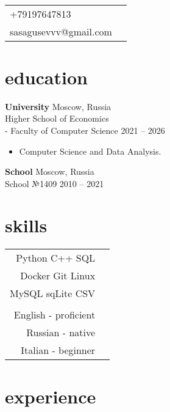 \documentclass[12pt]{article}
\newcommand{\heading}[2]{\centering{\sffamily\Huge #1}\\\smallskip{\large{#2}}}
\newcommand{\entry}[4]{{{\textbf{#1}}} \hfill #3 \\ #2 \hfill #4}
\begin{document}
\vspace*{\fill}

\begin{paracol}{2}

\heading{Alex Gusev}

\switchcolumn

\vspace{0.01\textheight}
\begin{supertabular}{ll}
   +79197647813 \\
  sasagusevvv@gmail.com \\
\end{supertabular}

\bigskip
\switchcolumn*

\section{education}

\entry{University}{Higher School of Economics \\ - Faculty of Computer Science}{Moscow, Russia}{2021 -- 2026}
\begin{itemize}[noitemsep,leftmargin=3.5mm,rightmargin=0mm,topsep=6pt]
  \item Computer Science and Data Analysis.
\end{itemize}

\medskip

\entry{School}{School №1409}{Moscow, Russia}{2010 -- 2021}

\switchcolumn

\section{skills}
\begin{supertabular}{rl}
  Python C++ SQL \\
  Docker Git Linux \\
  MySQL sqLite  CSV \\\\

  English - proficient \\
  Russian - native \\
  Italian - beginner \\
\end{supertabular}

\switchcolumn*

\section{experience}


\end{paracol}
\end{document}
